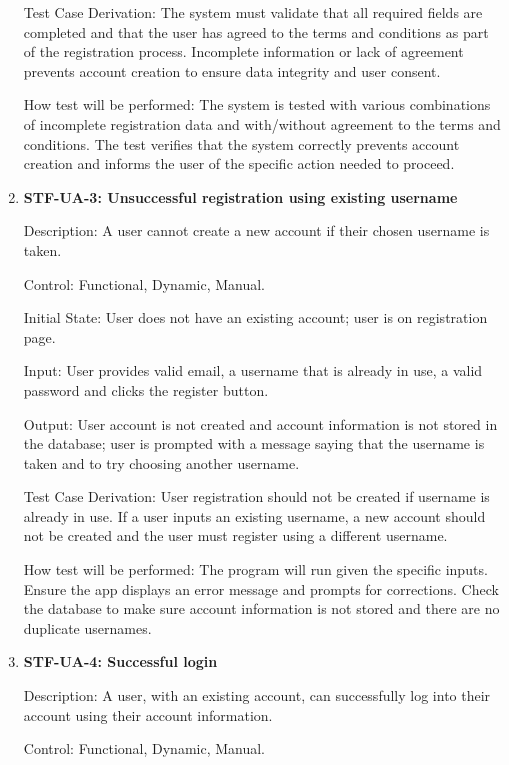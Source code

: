 \documentclass[12pt, titlepage]{article}
\begin{document}
\begin{enumerate}
        Test Case Derivation: The system must validate that all required fields are completed and that the user has agreed to the terms and conditions as part of the registration process. Incomplete information or lack of agreement prevents account creation to ensure data integrity and user consent.
        
        How test will be performed: The system is tested with various combinations of incomplete registration data and with/without agreement to the terms and conditions. The test verifies that the system correctly prevents account creation and informs the user of the specific action needed to proceed.

        \item{\textbf{STF-UA-3: Unsuccessful registration using existing username}\\}

        Description: A user cannot create a new account if their chosen username is taken.

        Control:  Functional, Dynamic, Manual.

        Initial State: User does not have an existing account; user is on registration page.

        Input: User provides valid email, a username that is already in use, a valid password and clicks the register button.

        Output: User account is not created and account information is not stored in the database; user is prompted with a message saying that the username is taken and to try choosing another username.

        Test Case Derivation: User registration should not be created if username is already in use. If a user inputs an existing username, a new account should not be created and the user must register using a different username.

        How test will be performed: The program will run given the specific inputs. Ensure the app displays an error message and prompts for corrections. Check the database to make sure account information is not stored and there are no duplicate usernames.

        \item{\textbf{STF-UA-4: Successful login}\\}

        Description: A user, with an existing account, can successfully log into their account using their account information.

        Control: Functional, Dynamic, Manual.


\end{enumerate}
\end{document}
